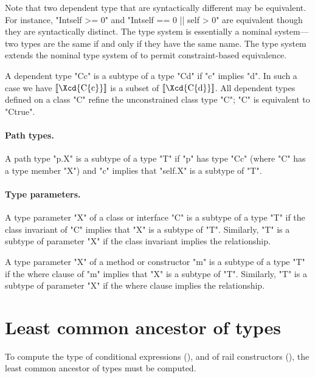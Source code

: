 Note that two dependent type that are syntactically different may be
equivalent. For instance, \xcd"Int{self >= 0}" and
\xcd"Int{self == 0 || self > 0}" are equivalent though they are syntactically
distinct. The \Java{} type system is essentially a nominal system---two
types are the same if and only if they have the same name. The \Xten{}
type system extends the nominal type system of \Java{} to permit
constraint-based equivalence.

A dependent type \xcd"C{c}" is a subtype of a type \xcd"C{d}" if
\xcd"c" implies \xcd"d".  In such a case we have
$\LL{\mbox{\Xcd{C\{c\}}}}$ is a
subset of $\LL{\mbox{\Xcd{C\{d\}}}}$. All dependent types
defined on a class \xcd"C"
refine the unconstrained class type \xcd"C"; \xcd"C" is
equivalent to \xcd"C{true}".

\paragraph{Path types.}

A path type \xcd"p.X" is a subtype of a type \xcd"T" if
\xcd"p" has type \xcd"C{c}" (where \xcd"C" has a type member
\xcd"X") and \xcd"c" implies that \xcd"self.X" is a subtype of \xcd"T".

\paragraph{Type parameters.}

A type parameter \xcd"X" of a class or interface \xcd"C"
is a subtype of a type \xcd"T" if
the 
class invariant of \xcd"C" implies that \xcd"X" is a subtype of \xcd"T".
Similarly, \xcd"T" is a subtype of parameter \xcd"X" if the
class invariant implies the relationship.

A type parameter \xcd"X" of a method
\iftypeparams\else
or constructor
\fi
\xcd"m"
is a subtype of a type \xcd"T" if
the 
where clause of \xcd"m" implies that \xcd"X" is a subtype of \xcd"T".
Similarly, \xcd"T" is a subtype of parameter \xcd"X" if the
where clause implies the relationship.


\section{Least common ancestor of types}
\label{LCA}

To compute the type of conditional expressions
(),
and of rail constructors
(), the least common ancestor of types
must be computed.

